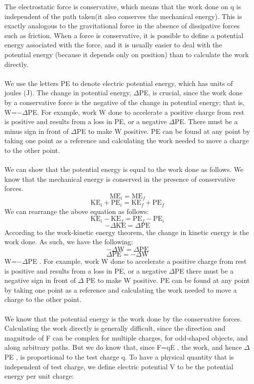 \documentclass[9pt]{exam}
\begin{document}
	The electrostatic force is conservative, which means that the work done on q is independent of the path taken(it also conserves the mechanical energy). This is exactly analogous to the gravitational force in the absence of dissipative forces such as friction. When a force is conservative, it is possible to define a potential energy associated with the force, and it is usually easier to deal with the potential energy (because it depends only on position) than to calculate the work directly. \\ \\
	We use the letters PE to denote electric potential energy, which has units of joules (J). The change in potential energy, $\varDelta$PE, is crucial, since the work done by a conservative force is the negative of the change in potential energy; that is, W=$-\varDelta$PE. For example, work W done to accelerate a positive charge from rest is positive and results from a loss in PE, or a negative $\varDelta$PE. There must be a minus sign in front of $\varDelta$PE to make W positive. PE can be found at any point by taking one point as a reference and calculating the work needed to move a charge to the other point. \\ \\
	We can show that the potential energy is equal to the work done as follows. We know that the mechanical energy is conserved in the presence of conservative forces. 
	$$\text{ME}_i=\text{ME}_f$$
	$$\text{KE}_i+\text{PE}_i=\text{KE}_f+\text{PE}_f$$
	We can rearrange the above equation as follows:
	$$\text{KE}_i-\text{KE}_f=\text{PE}_f-\text{PE}_i$$
	$$-\Delta\text{KE}=\Delta\text{PE}$$
	According to the work-kinetic energy theorem, the change in kinetic energy is the work done. As such, we have the following:
	$$-\Delta\text{W}=\Delta\text{PE}$$
	$$\Delta\text{PE}=-\Delta\text{W}$$
	W=$-\Delta$PE . For example, work  W  done to accelerate a positive charge from rest is positive and results from a loss in PE, or a negative  $\Delta$PE  there must be a negative sign in front of  $\Delta$ PE  to make  W  positive. PE can be found at any point by taking one point as a reference and calculating the work needed to move a charge to the other point.\\ \\
	We know that the potential energy is the work done by the conservative forces. Calculating the work directly is generally difficult, since  the direction and magnitude of F can be complex for multiple charges, for odd-shaped objects, and along arbitrary paths. But we do know that, since  F=qE , the work, and hence  $\Delta$PE , is proportional to the test charge  q. To have a physical quantity that is independent of test charge, we define electric potential  V to be the potential energy per unit charge:
\end{document}
